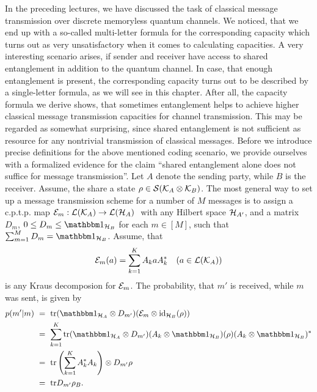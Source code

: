 In the preceding lectures, we have discussed the task of classical message transmission over discrete memoryless quantum channels. We noticed, that 
we end up with a so-called multi-letter formula for the corresponding capacity which turns out as very unsatisfactory when it comes to calculating capacities. \newline
A very interesting scenario arises, if sender and receiver have access to shared entanglement in addition to the quantum channel. In case, 
that enough entanglement is present, the corresponding capacity turns out to be described by a single-letter formula, as we will see in this chapter. 
After all, the capacity formula we derive shows, that sometimes entanglement helps to achieve higher classical message transmission capacities for 
channel transmission. This may be regarded as somewhat surprising, since shared entanglement is not sufficient as resource for any nontrivial transmission
of classical messages. \newline 
Before we introduce precise definitions for the above mentioned coding scenario, we provide ourselves with a formalized evidence for the claim ``shared entanglement 
alone does not suffice for message transmission''. \newline 
Let $A$ denote the sending party, while $B$ is the receiver. Assume, the share a state $\rho \in {\mathcal S}({\mathcal K}_A \otimes {\mathcal K}_B)$. The most general way to set up a message 
transmission scheme for a number of $M$ messages is to assign a c.p.t.p. map 
$%
 \cE_m: \cL(\cK_A) \rightarrow \cL(\cH_A) \
$%
with any Hilbert space ${\mathcal H}_{A'}$, and a matrix $D_m$, $0 \leq D_m \leq \bbmeins_{\cH_B}$ for each $m \in [M]$, such that $\sum_{m=1}^M D_m = \bbmeins_{\cH_B}$. Assume,
that 
\begin{align*}
 {\mathcal E}_m(a) = \sum_{k=1}^K A_k a A_k^\ast &&(a \in {\mathcal L}({\mathcal K}_A)) 
\end{align*}
is any Kraus decomposion for ${\mathcal E}_m$. The probability, that $m'$ is received, while $m$ was sent, is given by 
\begin{align*}
 p(m'|m) \ 
 &  = \ \tr (\bbmeins_{\cH_A} \otimes D_{m'})(\cE_m \otimes \id_{\cH_B}(\rho)) \\
 &  = \ \sum_{k=1}^K \tr (\bbmeins_{\cH_A} \otimes D_{m'})(A_k \otimes \bbmeins_{\cH_B})(\rho)(A_k \otimes \bbmeins_{\cH_B})^\ast \\
 &  = \ \tr \left(\sum_{k=1}^K A_k^\ast A_k \right) \otimes D_{m'} \rho \\
 &  = \ \tr D_{m'}\rho_B. 
\end{align*}
